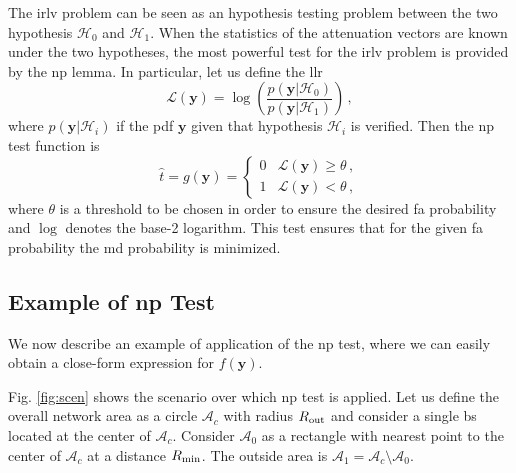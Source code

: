 \documentclass[conference,final]{IEEEtran}
\begin{document}
The \ac{irlv} problem can be seen as an hypothesis testing problem between the two hypothesis $\mathcal H_0$ and $\mathcal H_1$. When the statistics of the attenuation vectors are known under the two hypotheses, the most powerful test for the \ac{irlv} problem is provided by the \ac{np} lemma. In particular, let us  define the \ac{llr}
\begin{equation}\label{eq:lr}
    \mathcal{L}{(\bm{y})}=\log\left(\frac{p(\bm{y}|\mathcal{H}_0)}{p(\bm{y}|\mathcal{H}_1)}\right)\,,
\end{equation}
where $p(\bm{y}|\mathcal{H}_i)$ if the \ac{pdf} $\bm{y}$ given that hypothesis $\mathcal H_i$ is verified. Then the \ac{np} test function is 
\begin{equation}
\label{eq:thrOpt}
    \hat{t} = g(\bm{y}) = \begin{cases}
    0 & \mathcal{L}{(\bm{y})} \geq \theta\,, \\ 
    1 & \mathcal{L}{(\bm{y})} < \theta\,, 
    \end{cases}
\end{equation}
where $\theta$ is a threshold to be chosen in order to ensure the desired \ac{fa} probability and $\log$ denotes the base-2 logarithm. This test ensures that for the given \ac{fa} probability the \ac{md} probability is minimized. 

\subsection{Example of \ac{np} Test}
\label{sec:los}
We now describe an example of application of the \ac{np} test, where we can easily obtain a close-form expression for $f(\bm{y})$. 

Fig. \ref{fig:scen} shows the scenario over which \ac{np} test is applied. Let us define the overall network area as a circle $\mathcal{A}_c$ with radius $R_{\rm out}$ and consider a single \ac{bs} located at the center of $\mathcal{A}_c$. Consider $\mathcal{A}_{0}$ as a rectangle with nearest point to the center of $\mathcal{A}_c$ at a distance $R_{\rm min}$. The outside area is $\mathcal{A}_1 = \mathcal{A}_c \setminus \mathcal{A}_0$.
\end{document}
